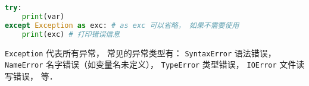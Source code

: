 
\begin{issues}
\issueDraft
\end{issues}

\begin{lstlisting}[language=python]
try:
    print(var)
except Exception as exc: # as exc 可以省略， 如果不需要使用
    print(exc) # 打印错误信息
\end{lstlisting}

\verb|Exception| 代表所有异常， 常见的异常类型有： \verb|SyntaxError| 语法错误， \verb|NameError| 名字错误（如变量名未定义）， \verb|TypeError| 类型错误， \verb|IOError| 文件读写错误， 等．
